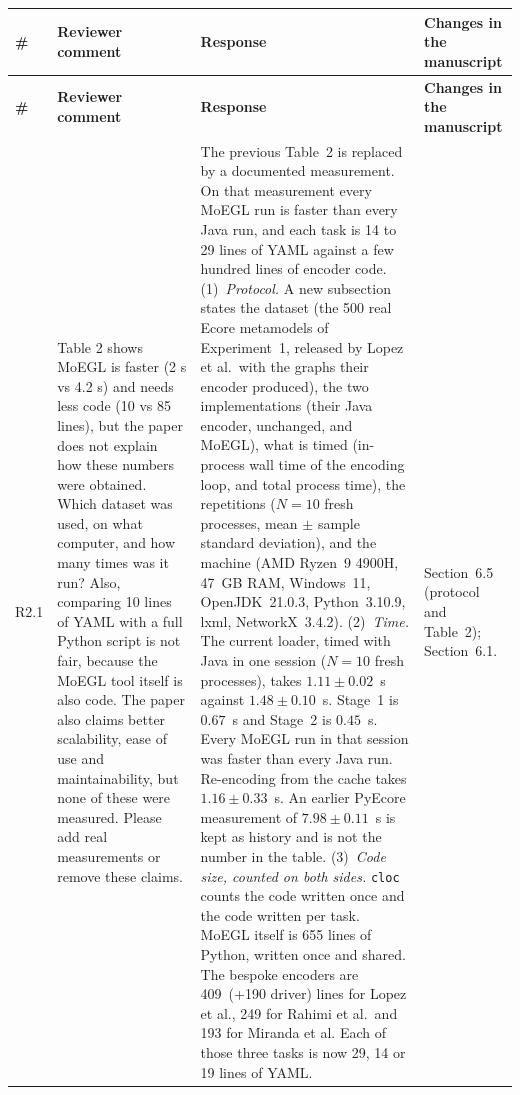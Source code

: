 \documentclass[11pt,a4paper]{article}
\begin{document}
\begin{longtable}{@{}P{1.0cm}P{4.3cm}P{5.9cm}P{3.9cm}@{}}
\toprule
\textbf{\#} & \textbf{Reviewer comment} & \textbf{Response} & \textbf{Changes in the manuscript} \\
\midrule
\endfirsthead
\toprule
\textbf{\#} & \textbf{Reviewer comment} & \textbf{Response} & \textbf{Changes in the manuscript} \\
\midrule
\endhead
\bottomrule
\endfoot

R2.1 &
Table 2 shows MoEGL is faster (2 s vs 4.2 s) and needs less code (10 vs 85 lines), but the paper does not explain how these numbers were obtained. Which dataset was used, on what computer, and how many times was it run? Also, comparing 10 lines of YAML with a full Python script is not fair, because the MoEGL tool itself is also code. The paper also claims better scalability, ease of use and maintainability, but none of these were measured. Please add real measurements or remove these claims. &
The previous Table~2 is replaced by a documented measurement. On that measurement every MoEGL run is faster than every Java run, and each task is 14 to 29 lines of YAML against a few hundred lines of encoder code.
(1)~\emph{Protocol.} A new subsection states the dataset (the 500 real Ecore metamodels of Experiment~1, released by Lopez et al.\ with the graphs their encoder produced), the two implementations (their Java encoder, unchanged, and MoEGL), what is timed (in-process wall time of the encoding loop, and total process time), the repetitions ($N=10$ fresh processes, mean $\pm$ sample standard deviation), and the machine (AMD Ryzen~9 4900H, 47~GB RAM, Windows~11, OpenJDK~21.0.3, Python~3.10.9, lxml, NetworkX~3.4.2).
(2)~\emph{Time.} The current loader, timed with Java in one session ($N=10$ fresh processes), takes $1.11\pm0.02$~s against $1.48\pm0.10$~s. Stage~1 is $0.67$~s and Stage~2 is $0.45$~s. Every MoEGL run in that session was faster than every Java run. Re-encoding from the cache takes $1.16\pm0.33$~s. An earlier PyEcore measurement of $7.98\pm0.11$~s is kept as history and is not the number in the table.
(3)~\emph{Code size, counted on both sides.} \texttt{cloc} counts the code written once and the code written per task. MoEGL itself is 655 lines of Python, written once and shared. The bespoke encoders are 409~(+190 driver) lines for Lopez et al., 249 for Rahimi et al.\ and 193 for Miranda et al. Each of those three tasks is now 29, 14 or 19 lines of YAML. &
Section~6.5 (protocol and Table~2); Section~6.1. \\
\midrule

\end{longtable}
\end{document}

